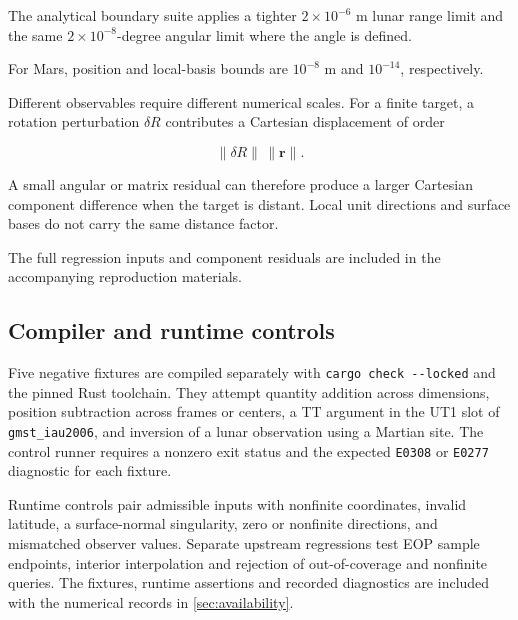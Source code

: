 The analytical boundary suite applies a tighter $2\times10^{-6}$ m lunar range limit and the same
$2\times10^{-8}$-degree angular limit where the angle is defined.

For Mars, position and local-basis bounds are $10^{-8}$ m and $10^{-14}$, respectively.

Different observables require different numerical scales. For a finite target, a rotation
perturbation $\delta R$ contributes a Cartesian displacement of order

\begin{equation}
    \|\delta R\|\,\|\boldsymbol r\|.
\end{equation}

A small angular or matrix residual can therefore produce a larger Cartesian component difference
when the target is distant. Local unit directions and surface bases do not carry the same distance
factor.

The full regression inputs and component residuals are included in the accompanying reproduction
materials.

\subsection{Compiler and runtime controls}

Five negative fixtures are compiled separately with \verb|cargo check --locked| and the pinned Rust
toolchain. They attempt quantity addition across dimensions, position subtraction across frames or
centers, a TT argument in the UT1 slot of \texttt{gmst\_iau2006}, and inversion of a lunar
observation using a Martian site. The control runner requires a nonzero exit status and the
expected \texttt{E0308} or \texttt{E0277} diagnostic for each fixture.

Runtime controls pair admissible inputs with nonfinite coordinates, invalid latitude, a
surface-normal singularity, zero or nonfinite directions, and mismatched observer values. Separate
upstream regressions test EOP sample endpoints, interior interpolation and rejection of
out-of-coverage and nonfinite queries. The fixtures, runtime assertions and recorded diagnostics
are included with the numerical records in \ref{sec:availability}.
